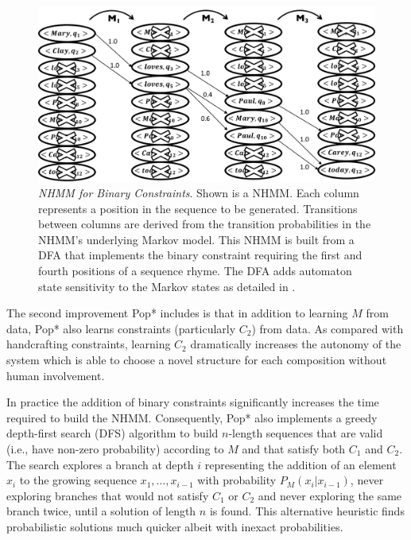 \documentclass[phd,electronic,oneside,twosidetoc,letterpaper,chaptercenter,parttop,lof,lot]{byumsphd}
\begin{document}
\begin{figure}
    \centering
    \includegraphics[width=\linewidth]{state_sensitive_nhmm}
    \caption{\textit{NHMM for Binary Constraints}. Shown is a NHMM. Each column represents a position in the sequence to be generated. Transitions between columns are derived from the transition probabilities in the NHMM's underlying Markov model. This NHMM is built from a DFA that implements the binary constraint requiring the first and fourth positions of a sequence rhyme. The DFA adds automaton state sensitivity to the Markov states as detailed in \cite{bodily2018relational}.}
    \label{fig:graphical_model}
\end{figure}

The second improvement Pop* includes is that in addition to learning ${M}$ from data, Pop* also learns constraints (particularly ${C_2}$) from data. As compared with handcrafting constraints, learning $C_2$ dramatically increases the autonomy of the system which is able to choose a novel structure for each composition without human involvement.

In practice the addition of binary constraints significantly increases the time required to build the NHMM. Consequently, Pop* also implements a greedy depth-first search (DFS) algorithm to build $n$-length sequences that are valid (i.e., have non-zero probability) according to $M$ and that satisfy both $C_1$ and $C_2$. The search explores a branch at depth $i$ representing the addition of an element $x_i$ to the growing sequence $x_1,\dots,x_{i-1}$ with probability $P_M(x_i|x_{i-1})$, never exploring branches that would not satisfy $C_1$ or $C_2$ and never exploring the same branch twice, until a solution of length $n$ is found. This alternative heuristic finds probabilistic solutions much quicker albeit with inexact probabilities.
\end{document}
